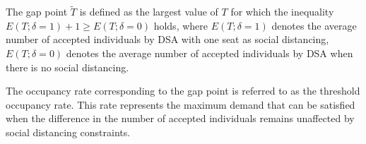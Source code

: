 



The gap point $\tilde{T}$ is defined as the largest value of $T$ for which the inequality $E(T; \delta =1)+1 \geq E(T; \delta = 0)$ holds, where $E(T; \delta =1)$ denotes the average number of accepted individuals by DSA with one seat as social distancing, $E(T; \delta = 0)$ denotes the average number of accepted individuals by DSA when there is no social distancing.

The occupancy rate corresponding to the gap point is referred to as the threshold occupancy rate. This rate represents the maximum demand that can be satisfied when the difference in the number of accepted individuals remains unaffected by social distancing constraints.

